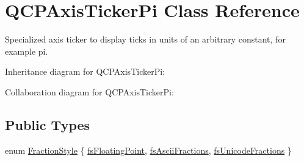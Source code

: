 \hypertarget{classQCPAxisTickerPi}{}\section{Q\+C\+P\+Axis\+Ticker\+Pi Class Reference}
\label{classQCPAxisTickerPi}


Specialized axis ticker to display ticks in units of an arbitrary constant, for example pi.  




Inheritance diagram for Q\+C\+P\+Axis\+Ticker\+Pi\+:


Collaboration diagram for Q\+C\+P\+Axis\+Ticker\+Pi\+:
\subsection*{Public Types}
\begin{DoxyCompactItemize}
\item 
enum \hyperlink{classQCPAxisTickerPi_a262f1534c7f0c79a7d5237f5d1e2c54c}{Fraction\+Style} \{ \hyperlink{classQCPAxisTickerPi_a262f1534c7f0c79a7d5237f5d1e2c54ca00f097b669b2a0e22f508f1ae97877d8}{fs\+Floating\+Point}, 
\hyperlink{classQCPAxisTickerPi_a262f1534c7f0c79a7d5237f5d1e2c54ca05a5457e0e14cb726f623e25282066b3}{fs\+Ascii\+Fractions}, 
\hyperlink{classQCPAxisTickerPi_a262f1534c7f0c79a7d5237f5d1e2c54ca92f38a938c8b179b23363d9993681c55}{fs\+Unicode\+Fractions}
 \}
\end{DoxyCompactItemize}
